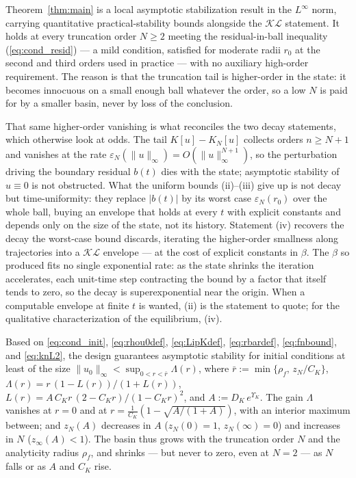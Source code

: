 \documentclass[amsthm]{autart}
\theoremstyle{plain}
\theoremstyle{definition}
\newcommand{\Linf}{L^\infty}
\newcommand{\eps}{\varepsilon}
\begin{document}
Theorem~\ref{thm:main} is a local asymptotic stabilization result in the $\Linf$ norm, carrying quantitative practical-stability bounds alongside the $\mathcal{KL}$ statement. It holds at every truncation order $N \ge 2$ meeting the residual-in-ball inequality (\ref{eq:cond_resid}) --- a mild condition, satisfied for moderate radii $r_0$ at the second and third orders used in practice --- with no auxiliary high-order requirement. The reason is that the truncation tail is higher-order in the state: it becomes innocuous on a small enough ball whatever the order, so a low $N$ is paid for by a smaller basin, never by loss of the conclusion.

That same higher-order vanishing is what reconciles the two decay statements, which otherwise look at odds. The tail $K[u] - K_N[u]$ collects orders $n \ge N+1$ and vanishes at the rate $\eps_N(\|u\|_\infty) = O(\|u\|_\infty^{N+1})$, so the perturbation driving the boundary residual $b(t)$ dies with the state; asymptotic stability of $u \equiv 0$ is not obstructed. What the uniform bounds (ii)--(iii) give up is not decay but time-uniformity: they replace $|b(t)|$ by its worst case $\eps_N(r_0)$ over the whole ball, buying an envelope that holds at every $t$ with explicit constants and depends only on the size of the state, not its history. Statement (iv) recovers the decay the worst-case bound discards, iterating the higher-order smallness along trajectories into a $\mathcal{KL}$ envelope --- at the cost of explicit constants in $\beta$. The $\beta$ so produced fits no single exponential rate: as the state shrinks the iteration accelerates, each unit-time step contracting the bound by a factor that itself tends to zero, so the decay is superexponential near the origin. When a computable envelope at finite $t$ is wanted, (ii) is the statement to quote; for the qualitative characterization of the equilibrium, (iv).

Based on \eqref{eq:cond_init}, \eqref{eq:rhou0def}, \eqref{eq:LipKdef}, \eqref{eq:rbardef}, \eqref{eq:fnbound}, and \eqref{eq:knL2}, the design guarantees asymptotic stability for initial conditions at least of the size $\|u_0\|_\infty < \sup_{0 < r < \bar r} \Lambda(r)$, where $\bar r := \min\{\rho_f,\, z_N/C_K\}$, $\Lambda(r) = r\,(1 - L(r))/(1 + L(r))$, $L(r) = A\,C_K r\,(2 - C_K r)/(1 - C_K r)^2$, and $A := D_K\, e^{\Upsilon_K}$. The gain $\Lambda$ vanishes at $r = 0$ and at $r = \tfrac{1}{C_K}(1 - \sqrt{A/(1+A)})$, with an interior maximum between; and $z_N(A)$ decreases in $A$ ($z_N(0) = 1$, $z_N(\infty) = 0$) and increases in $N$ ($z_\infty(A) < 1$). The basin thus grows with the truncation order $N$ and the analyticity radius $\rho_f$, and shrinks --- but never to zero, even at $N = 2$ --- as $N$ falls or as $A$ and $C_K$ rise.
\end{document}
